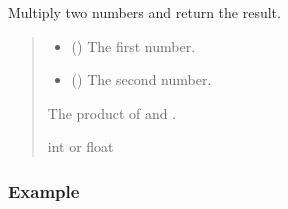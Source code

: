 \documentclass[letterpaper,10pt,english]{sphinxmanual}
\begin{document}
\begin{fulllineitems}
\label{\detokenize{multiply:multiply.multiply_numbers}}
\pysigstartsignatures
{}
\pysigstopsignatures
\sphinxAtStartPar
Multiply two numbers and return the result.
\begin{quote}\begin{description}
\begin{itemize}
\item {} 
\sphinxAtStartPar
{} () \sphinxhyphen{}\sphinxhyphen{} The first number.

\item {} 
\sphinxAtStartPar
{} () \sphinxhyphen{}\sphinxhyphen{} The second number.

\end{itemize}

\sphinxAtStartPar
The product of  and .

\sphinxAtStartPar
int or float

\end{description}\end{quote}
\subsubsection*{Example}

\begin{sphinxVerbatim}[commandchars=\\\{\}]
 
\end{sphinxVerbatim}

\end{fulllineitems}
\end{document}
